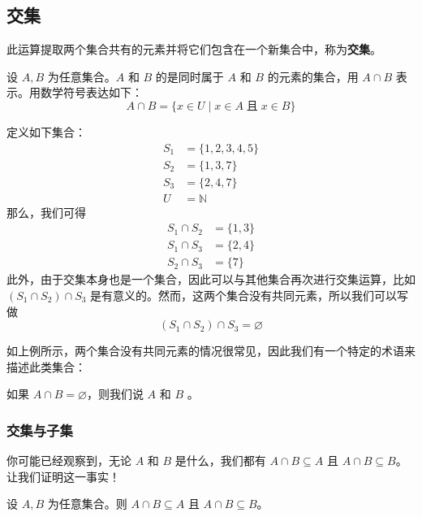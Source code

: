 \subsection{交集}

此运算提取两个集合共有的元素并将它们包含在一个新集合中，称为\textbf{交集}。

\begin{definition}
    设 $A, B$ 为任意集合。$A$ 和 $B$ 的是同时属于 $A$ 和 $B$ 的元素的集合，用 $A \cap B$ 表示。用数学符号表达如下：
    \[A \cap B = \{x \in U \mid x \in A \;\text{且}\; x \in B\}\]
\end{definition}

\begin{example}\label{ex:example3.5.1}
    定义如下集合：
    \begin{align*}
        S_1 &= \{1, 2, 3, 4, 5\}\\
        S_2 &= \{1, 3, 7\}\\
        S_3 &= \{2, 4, 7\}\\
        U &= \mathbb{N}
    \end{align*}
    那么，我们可得
    \begin{align*}
        S_1 \cap S_2 &= \{1, 3\} \\
        S_1 \cap S_3 &= \{2, 4\} \\
        S_2 \cap S_3 &= \{7\}
    \end{align*}
    此外，由于交集本身也是一个集合，因此可以与其他集合再次进行交集运算，比如 $(S_1 \cap S_2) \cap S_3$ 是有意义的。然而，这两个集合没有共同元素，所以我们可以写做
    \[(S_1 \cap S_2) \cap S_3 = \varnothing\]
\end{example}

如上例所示，两个集合没有共同元素的情况很常见，因此我们有一个特定的术语来描述此类集合：

\begin{definition}
    如果 $A \cap B = \varnothing$，则我们说 $A$ 和 $B$ 。
\end{definition}

\subsubsection*{交集与子集}

你可能已经观察到，无论 $A$ 和 $B$ 是什么，我们都有 $A \cap B \subseteq A$ 且 $A \cap B \subseteq B$。让我们证明这一事实！

\begin{proposition}
    设 $A, B$ 为任意集合。则 $A \cap B \subseteq A$ 且 $A \cap B \subseteq B$。
\end{proposition}

